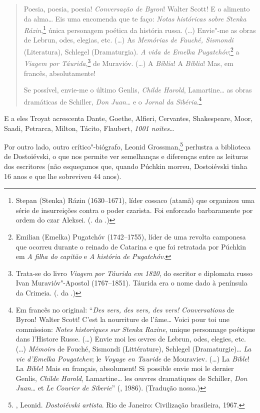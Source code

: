 \begin{quotation}
Poesia, poesia, poesia! \emph{Conversação de Byron}! Walter Scott! E o alimento da alma\ldots{} Eis uma encomenda que te faço: \emph{Notas históricas sobre Stenka Rázin},\footnote{Stepan (Stenka) Rázin (1630--1671), líder cossaco (atamã) que organizou uma série de insurreições contra o poder czarista. Foi enforcado barbaramente por ordem do czar Aleksei. (. da .)} única personagem poética da história russa. (\ldots{}) Envie"-me as obras de Lebrun, odes, elegias, etc. (\ldots{}) As \emph{Memórias de Fauché, Sismondi} (Literatura), Schlegel (Dramaturgia). \emph{A vida de Emelka Pugatchóv};\footnote{Emilian (Emelka) Pugatchóv (1742--1755), líder de uma revolta camponesa que ocorreu durante o reinado de Catarina  e que foi retratada por Púchkin em \emph{A filha do capitão} e \emph{A história de Pugatchóv}.} a \emph{Viagem por Táurida},\footnote{Trata-se do livro \emph{Viagem por Táurida em 1820}, do escritor e diplomata russo Ivan Muravióv"-Apostol (1767--1851). Táurida era o nome dado à península da Crimeia. (. da .)} de Muravióv. (\ldots{}) A \emph{Bíblia}! A \emph{Bíblia}! Mas, em francês, absolutamente!

Se possível, envie-me o último Genlis, \emph{Childe Harold}, Lamartine\ldots{} as obras dramáticas de Schiller, \emph{Don Juan}\ldots{} e o \emph{Jornal da Sibéria}.\footnote{Em francês no original: ``\emph{Des vers, des vers, des vers!} \emph{Conversations} de Byron! Walter Scott! C'est la nourriture de l'âme\ldots{} Voici pour toi une commission: \emph{Notes historiques sur Stenka Razine}, unique personnage poétique dans l'Histore Russe. (\ldots{}) Envie moi les œvres de Lebrun, odes, elegies, etc. (\ldots{}) \emph{Mémoirs} de Fouché, Sismondi (Littérature), Schlegel (Dramaturgie)\ldots{} \emph{La vie d'Emelka Pougatchev}; le \emph{Voyage en Tauride} de Mouraviev. (\ldots{}) La \emph{Bible}! La \emph{Bible}! Mais en français, absolument! Si possible envie moi le dernier Genlis, \emph{Childe Harold}, Lamartine\ldots{} les œuvres dramatiques de Schiller, \emph{Don Juan}\ldots{} et \emph{Le Courier de Siberie}'' (, 1986). (Tradução nossa.)}
\end{quotation}

E a eles Troyat acrescenta Dante, Goethe, Alfieri, Cervantes,
Shakespeare, Moor, Saadi, Petrarca, Milton, Tácito, Flaubert, \emph{1001
noites}\ldots{}

Por outro lado, outro crítico"-biógrafo, Leonid Grossman,\footnote{, Leonid. \emph{Dostoiévski artista}. Rio de Janeiro: Civilização brasileira, 1967.} perlustra a biblioteca de Dostoiévski, o que nos permite ver semelhanças e diferenças entre as leituras dos escritores (não esqueçamos que, quando Púchkin morreu, Dostoiévski tinha 16 anos e que lhe sobreviveu 44 anos).

